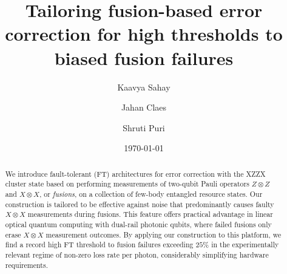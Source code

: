\documentclass[reprint,
groupedaddress,
 prl,amsmath,amssymb,
 aps]{revtex4-2}
\title@column\titleblock@produce
\makeatletter
\def\maketitle{
	\@author@finish
	\title@column\titleblock@produce
	\suppressfloats[t]}
\theoremstyle{definition}
\makeatother
\begin{document}
\title{Tailoring fusion-based error correction for high thresholds to biased fusion failures}



\author{Kaavya Sahay}
\author{Jahan Claes}
\author{Shruti Puri}


\begin{abstract}

We introduce fault-tolerant (FT) architectures for error correction with the XZZX cluster state based on performing measurements of two-qubit Pauli operators $Z\otimes Z$ and $X\otimes X$, or {\it fusions}, on a collection of few-body entangled resource states. 
Our construction is tailored to be effective against noise that predominantly causes faulty $X\otimes X$ measurements during fusions. This feature offers practical advantage in linear optical quantum computing with dual-rail photonic qubits, where failed fusions only erase $X\otimes X$ measurement outcomes.
By applying our construction to this platform, we find a record high FT threshold to fusion failures exceeding $25\%$ in the experimentally relevant regime of non-zero loss rate per photon, considerably simplifying hardware requirements.

\end{abstract}
\date{\today}

\maketitle
\end{document}
